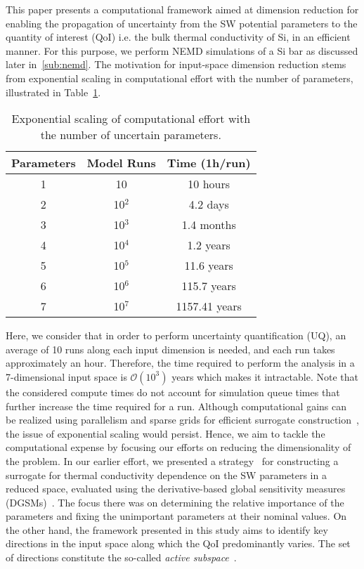 This paper presents a computational framework aimed at dimension reduction
for enabling the propagation of uncertainty from the SW potential parameters to the
quantity of interest (QoI) i.e. the bulk thermal conductivity of Si,
in an efficient manner. For this purpose, we perform NEMD simulations of a Si bar
as discussed later in~\ref{sub:nemd}. The
motivation for input-space dimension reduction stems from exponential scaling in
computational effort with the number of parameters, illustrated in Table~\ref{tab:effort}. 
%
\newcommand{\ra}[1]{\renewcommand{\arraystretch}{#1}}
\begin{table}[htbp]
\centering
\ra{1.3}
\begin{tabular}{@{}ccc@{}}\toprule
Parameters & Model Runs & Time (1h/run)\\
\bottomrule
1 & 10 & 10 hours \\
2 & 10$^2$ & 4.2 days \\
3 & 10$^3$ & 1.4 months \\
4 & 10$^4$ & 1.2 years \\
5 & 10$^5$ & 11.6 years \\
6 & 10$^6$ & 115.7 years \\
7 & 10$^7$ & 1157.41 years \\
\bottomrule
\end{tabular}
\caption{Exponential scaling of computational effort with the number of uncertain parameters.}
\label{tab:effort}
\end{table}
%
Here, we consider that in order to perform uncertainty quantification (UQ),
an average of 10 runs along each input dimension
is needed, and each run takes approximately an hour. Therefore, the time required to 
perform the analysis in a 7-dimensional input space is $\mathcal{O}(10^3)$ years which makes it
intractable. Note that the considered compute times do not account for simulation queue times that further 
increase the time required for a run. 
Although computational gains can be realized using parallelism and sparse grids
for efficient surrogate construction~\cite{Ma:2009,Constantine:2012,Petvipusit:2014,Vohra:2014}, 
the issue of exponential scaling would persist.  
Hence, we aim to tackle the computational expense by focusing our efforts on reducing the 
dimensionality of the problem.
In our earlier effort, we presented a strategy~\cite{Vohra:2018b}
for constructing a surrogate for thermal conductivity dependence on the SW parameters
in a reduced space, evaluated using the derivative-based global sensitivity measures
(DGSMs)~\cite{Vohra:2018a}. The focus there was on determining the relative importance of the
parameters and fixing the unimportant parameters at their nominal values. On the other hand, the
framework presented in this study aims to identify key directions in the input space along which the
QoI predominantly varies. The set of directions constitute the so-called 
\textit{active subspace}~\cite{Constantine:2015}.  

